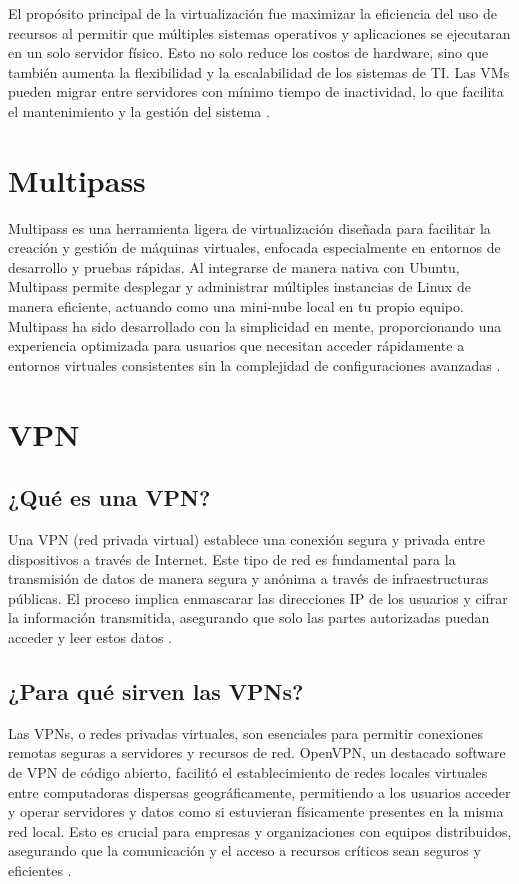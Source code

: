 El propósito principal de la virtualización fue maximizar la eficiencia del uso de recursos al permitir que múltiples sistemas operativos y aplicaciones se ejecutaran en un solo servidor físico. Esto no solo reduce los costos de hardware, sino que también aumenta la flexibilidad y la escalabilidad de los sistemas de TI. Las VMs pueden migrar entre servidores con mínimo tiempo de inactividad, lo que facilita el mantenimiento y la gestión del sistema \cite{Virtualizacion2}.

\section{Multipass}
Multipass es una herramienta ligera de virtualización diseñada para facilitar la creación y gestión de máquinas virtuales, enfocada especialmente en entornos de desarrollo y pruebas rápidas. Al integrarse de manera nativa con Ubuntu, Multipass permite desplegar y administrar múltiples instancias de Linux de manera eficiente, actuando como una mini-nube local en tu propio equipo. Multipass ha sido desarrollado con la simplicidad en mente, proporcionando una experiencia optimizada para usuarios que necesitan acceder rápidamente a entornos virtuales consistentes sin la complejidad de configuraciones avanzadas \cite{Multipass}.

\section{VPN}
\subsection{¿Qué es una VPN?}
Una VPN (red privada virtual) establece una conexión segura y privada entre dispositivos a través de Internet. Este tipo de red es fundamental para la transmisión de datos de manera segura y anónima a través de infraestructuras públicas. El proceso implica enmascarar las direcciones IP de los usuarios y cifrar la información transmitida, asegurando que solo las partes autorizadas puedan acceder y leer estos datos \cite{VPN}.

\subsection{¿Para qué sirven las VPNs?}
Las VPNs, o redes privadas virtuales, son esenciales para permitir conexiones remotas seguras a servidores y recursos de red. OpenVPN, un destacado software de VPN de código abierto, facilitó el establecimiento de redes locales virtuales entre computadoras dispersas geográficamente, permitiendo a los usuarios acceder y operar servidores y datos como si estuvieran físicamente presentes en la misma red local. Esto es crucial para empresas y organizaciones con equipos distribuidos, asegurando que la comunicación y el acceso a recursos críticos sean seguros y eficientes \cite{OpenVPN}.

